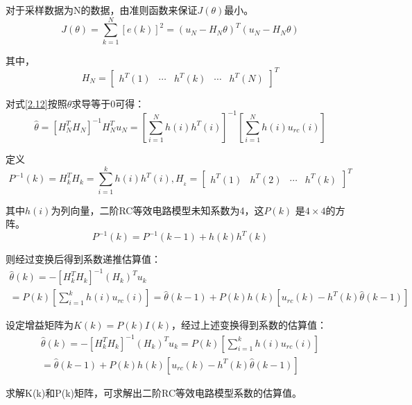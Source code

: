 \begin{enumerate}
对于采样数据为N的数据，由准则函数来保证$J\left( \theta  \right)$最小。
\begin{equation}\label{2.12}
J\left( \theta  \right) = \sum\limits_{k = 1}^N {\left[ {e(k)} \right]_{}^2}  = {\left( {{u_N} - {H_N}\theta } \right)^T}({u_N} - {H_N}\theta )
\end{equation}

其中，
\begin{equation}
{H_N} = {\left[ {\begin{array}{*{20}{c}}
{{h^T}(1)}& \cdots &{{h^T}(k)}& \cdots &{{h^T}(N)}
\end{array}} \right]^T}
\end{equation}

对式\ref{2.12}按照$\theta$求导等于0可得：
\begin{equation}
\widehat \theta  = {\left[ {H_N^T{H_N}} \right]^{ - 1}}H_N^T{u_N} = {\left[ {\sum\limits_{i = 1}^N {h(i){h^T}(i)} } \right]^{ - 1}}\left[ {\sum\limits_{i = 1}^N {h(i){u_{rc}}(i)} } \right]
\end{equation}

定义
\begin{equation}
{P^{ - 1}}(k) = H_k^T{H_k} = {\sum\limits_{i = 1}^k {h(i){h^T}(i),{H_{_k}} = \left[ {\begin{array}{*{20}{c}}
{{h^T}(1)}&{{h^T}(2)}& \cdots &{{h^T}(k)}
\end{array}} \right]} ^T}
\end{equation}

其中$h\left( i \right)$为列向量，二阶RC等效电路模型未知系数为4，这$P\left( k \right)$ 是$4 \times 4$的方阵。
\begin{equation}
{P^{ - 1}}(k) = {P^{ - 1}}(k - 1) + h(k){h^T}(k)
\end{equation}

则经过变换后得到系数递推估算值：
\begin{equation}
\begin{array}{l}
\widehat \theta (k) =  - {\left[ {H_k^T{H_k}} \right]^{ - 1}}{({H_k})^T}{u_k}\\
 = P(k)\left[ {\sum\limits_{i = 1}^k {h(i){u_{rc}}(i)} } \right] = \widehat \theta (k - 1) + P(k)h(k)\left[ {{u_{rc}}(k) - {h^T}(k)\widehat \theta (k - 1)} \right]
\end{array}
\end{equation}

设定增益矩阵为$K\left( k \right) = P\left( k \right)I\left( k \right)$，经过上述变换得到系数的估算值：
\begin{equation}
\begin{array}{l}
\widehat \theta (k) =  - {\left[ {H_k^T{H_k}} \right]^{ - 1}}{({H_k})^T}{u_k} = P(k)\left[ {\sum\limits_{i = 1}^k {h(i){u_{rc}}(i)} } \right]\\
 = \widehat \theta (k - 1) + P(k)h(k)\left[ {{u_{rc}}(k) - {h^T}(k)\widehat \theta (k - 1)} \right]
\end{array}
\end{equation}

 求解K(k)和P(k)矩阵，可求解出二阶RC等效电路模型系数的估算值。
\end{enumerate}
